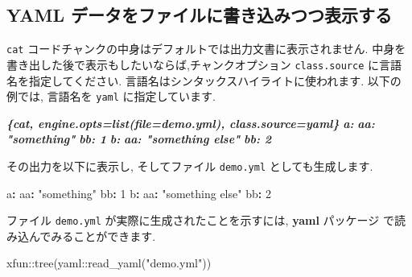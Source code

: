 \documentclass[
  11pt,
  lualatex,ja=standard,jafont=noto]{bxjsreport}
\newenvironment{Shaded}{\begin{snugshade}}{\end{snugshade}}
\newcommand{\AttributeTok}[1]{\textcolor[rgb]{0.77,0.63,0.00}{#1}}
\newcommand{\DecValTok}[1]{\textcolor[rgb]{0.00,0.00,0.81}{#1}}
\newcommand{\FunctionTok}[1]{\textcolor[rgb]{0.00,0.00,0.00}{#1}}
\newcommand{\InformationTok}[1]{\textcolor[rgb]{0.56,0.35,0.01}{\textbf{\textit{#1}}}}
\newcommand{\KeywordTok}[1]{\textcolor[rgb]{0.13,0.29,0.53}{\textbf{#1}}}
\newcommand{\NormalTok}[1]{#1}
\newcommand{\SpecialCharTok}[1]{\textcolor[rgb]{0.00,0.00,0.00}{#1}}
\newcommand{\StringTok}[1]{\textcolor[rgb]{0.31,0.60,0.02}{#1}}
\begin{document}
\hypertarget{yaml-ux30c7ux30fcux30bfux3092ux30d5ux30a1ux30a4ux30ebux306bux66f8ux304dux8fbcux307fux3064ux3064ux8868ux793aux3059ux308b}{%
\subsection{YAML データをファイルに書き込みつつ表示する}\label{yaml-ux30c7ux30fcux30bfux3092ux30d5ux30a1ux30a4ux30ebux306bux66f8ux304dux8fbcux307fux3064ux3064ux8868ux793aux3059ux308b}}

\texttt{cat} コードチャンクの中身はデフォルトでは出力文書に表示されません. 中身を書き出した後で表示もしたいならば,チャンクオプション \texttt{class.source} に言語名を指定してください. 言語名はシンタックスハイライトに使われます. 以下の例では, 言語名を \texttt{yaml} に指定しています.

\begin{Shaded}
\begin{Highlighting}[]
\InformationTok{\textasciigrave{}\textasciigrave{}\textasciigrave{}\{cat, engine.opts=list(file=\textquotesingle{}demo.yml\textquotesingle{}), class.source=\textquotesingle{}yaml\textquotesingle{}\}}
\InformationTok{a:}
\InformationTok{  aa: "something"}
\InformationTok{  bb: 1}
\InformationTok{b:}
\InformationTok{  aa: "something else"}
\InformationTok{  bb: 2}
\InformationTok{\textasciigrave{}\textasciigrave{}\textasciigrave{}}
\end{Highlighting}
\end{Shaded}

その出力を以下に表示し, そしてファイル \texttt{demo.yml} としても生成します.

\begin{Shaded}
\begin{Highlighting}[numbers=left,,]
\FunctionTok{a}\KeywordTok{:}
\AttributeTok{  }\FunctionTok{aa}\KeywordTok{:}\AttributeTok{ }\StringTok{"something"}
\AttributeTok{  }\FunctionTok{bb}\KeywordTok{:}\AttributeTok{ }\DecValTok{1}
\FunctionTok{b}\KeywordTok{:}
\AttributeTok{  }\FunctionTok{aa}\KeywordTok{:}\AttributeTok{ }\StringTok{"something else"}
\AttributeTok{  }\FunctionTok{bb}\KeywordTok{:}\AttributeTok{ }\DecValTok{2}
\end{Highlighting}
\end{Shaded}

ファイル \texttt{demo.yml} が実際に生成されたことを示すには, \textbf{yaml} パッケージ \autocite{R-yaml} で読み込んでみることができます.

\begin{Shaded}
\begin{Highlighting}[numbers=left,,]
\NormalTok{xfun}\SpecialCharTok{::}\FunctionTok{tree}\NormalTok{(yaml}\SpecialCharTok{::}\FunctionTok{read\_yaml}\NormalTok{(}\StringTok{"demo.yml"}\NormalTok{))}
\end{Highlighting}
\end{Shaded}
\end{document}
